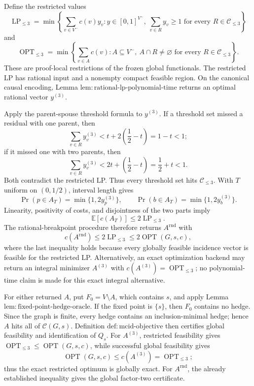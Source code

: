 Define the restricted values
\[
 \operatorname{LP}_{\leq3}
 =\min\left\{\sum_{v\in V^{-}}c(v)y_v:
 y\in[0,1]^{V^{-}},\ \sum_{v\in R}y_v\geq1
 \text{ for every }R\in\mathcal C_{\leq3}\right\}
\]
and
\[
 \operatorname{OPT}_{\leq3}
 =\min\left\{\sum_{v\in A}c(v):
 A\subseteq V^{-},\ A\cap R\neq\varnothing
 \text{ for every }R\in\mathcal C_{\leq3}\right\}.
\]
These are proof-local restrictions of the frozen global functionals.  The
restricted LP has rational input and a nonempty compact feasible region.
On the canonical causal encoding, Lemma
\(\mathrm{lem{:}rational\mbox{-}lp\mbox{-}polynomial\mbox{-}time}\)
returns an optimal rational vector \(y^{(3)}\).

Apply the parent-spouse threshold formula to \(y^{(3)}\).  If a threshold
set missed a residual with one parent, then
\[
 \sum_{v\in R}y^{(3)}_v
 <t+2\left(\frac12-t\right)=1-t<1;
\]
if it missed one with two parents, then
\[
 \sum_{v\in R}y^{(3)}_v
 <2t+\left(\frac12-t\right)=\frac12+t<1.
\]
Both contradict the restricted LP.  Thus every threshold set hits
\(\mathcal C_{\leq3}\).  With \(T\) uniform on \((0,1/2)\), interval
length gives
\[
 \Pr(p\in A_T)=\min\{1,2y^{(3)}_p\},
 \qquad
 \Pr(b\in A_T)=\min\{1,2y^{(3)}_b\}.
\]
Linearity, positivity of costs, and disjointness of the two parts imply
\[
 \mathbb E[c(A_T)]\leq2\operatorname{LP}_{\leq3}.
\]
The rational-breakpoint procedure therefore returns
\(A^{\mathrm{rnd}}\) with
\[
 c(A^{\mathrm{rnd}})\leq2\operatorname{LP}_{\leq3}
 \leq2\operatorname{OPT}(G,s,c),
\]
where the last inequality holds because every globally feasible incidence
vector is feasible for the restricted LP.  Alternatively, an exact
optimization backend may return an integral minimizer \(A^{(3)}\) with
\(c(A^{(3)})=\operatorname{OPT}_{\leq3}\); no polynomial-time claim is
made for this exact integral alternative.

For either returned \(A\), put \(F_0=V\setminus A\), which contains \(s\),
and apply Lemma
\(\mathrm{lem{:}fixed\mbox{-}point\mbox{-}hedge\mbox{-}oracle}\).  If the
fixed point is \(\{s\}\), then \(F_0\) contains no hedge.  Since the graph
is finite, every hedge contains an inclusion-minimal hedge; hence \(A\)
hits all of \(\mathcal C(G,s)\).  Definition
\(\mathrm{def{:}mcid\mbox{-}objective}\) then certifies global feasibility
and identification of \(Q_s\).  For \(A^{(3)}\), restricted feasibility
gives \(\operatorname{OPT}_{\leq3}\leq\operatorname{OPT}(G,s,c)\), while
successful global feasibility gives
\[
 \operatorname{OPT}(G,s,c)
 \leq c(A^{(3)})=\operatorname{OPT}_{\leq3};
\]
thus the exact restricted optimum is globally exact.  For
\(A^{\mathrm{rnd}}\), the already established inequality gives the global
factor-two certificate.

